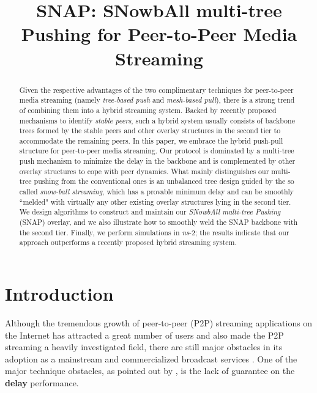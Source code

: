 \documentclass[conference]{IEEEtran}
\begin{document}
\title{SNAP: SNowbAll multi-tree Pushing for Peer-to-Peer Media Streaming}
\author{
}
\maketitle

\begin{abstract}
  Given the respective advantages of the two complimentary techniques for peer-to-peer media streaming (namely \textit{tree-based push} and \textit{mesh-based pull}), there is a strong trend of combining them into a hybrid streaming system. Backed by recently proposed mechanisms to identify \textit{stable peers}, such a hybrid system usually consists of backbone trees formed by the stable peers and other overlay structures in the second tier to accommodate the remaining peers. In this paper, we embrace the hybrid push-pull structure for peer-to-peer media streaming. Our protocol is dominated by a multi-tree push mechanism to minimize the delay in the backbone and is complemented by other overlay structures to cope with peer dynamics. What mainly distinguishes our multi-tree pushing from the conventional ones is an unbalanced tree design guided by the so called \textit{snow-ball streaming}, which has a provable minimum delay and can be smoothly ``melded" with virtually any other existing overlay structures lying in the second tier. We design algorithms to construct and maintain our \textit{SNowbAll multi-tree Pushing} (SNAP) overlay, and we also illustrate how to smoothly weld the SNAP backbone with the second tier. Finally, we perform simulations in \textit{ns}-2; the results indicate that our approach outperforms a recently proposed hybrid streaming system.
\end{abstract}


\section{Introduction} \label{sec:intro}
Although the tremendous growth of peer-to-peer (P2P) streaming applications on the Internet has attracted a great number of users and also made the P2P streaming a heavily investigated field, there are still major obstacles in its adoption as a mainstream and commercialized broadcast services \cite{LiuRLZ-IEEEProc07}. One of the major technique obstacles, as pointed out by \cite{LiuRLZ-IEEEProc07,HeiLR-IEEECOMMAG08,FengLL-INFOCOM09}, is the lack of guarantee on the \textbf{delay} performance.
\end{document}
